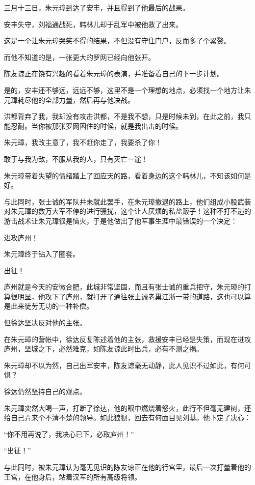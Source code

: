 \begin{multicols}{\theparacolNo}
		三月十三日，朱元璋到达了安丰，并且得到了他最后的战果。

		安丰失守，刘福通战死，韩林儿却于乱军中被他救了出来。

		这是一个让朱元璋哭笑不得的结果，不但没有守住门户，反而多了个累赘。

		而他不知道的是，一张更大的罗网已经向他张开。

		陈友谅正在饶有兴趣的看着朱元璋的表演，并准备着自己的下一步计划。

		是的，安丰还不够远，远远不够，这里不是一个理想的地点，必须找一个地方让朱元璋耗尽他的全部力量，然后再与他决战。

		洪都背弃了我，我却没有攻击洪都，不是我不想，只是时候未到，在此之前，我只能忍耐。当你被那张罗网困住的时候，就是我出击的时候。

		朱元璋，我改主意了，我不赶你走了，我要杀了你！

		敢于与我为敌，不服从我的人，只有灭亡一途！

		朱元璋带着失望的情绪踏上了回应天的路，看着身边的这个韩林儿，不知该如何是好。

		与此同时，张士诚的军队并未就此罢手，在朱元璋撤退的路上，他们组成小股武装对朱元璋的数万大军不停的进行骚扰，这个让人厌烦的私盐贩子！这种不打不逃的游击战术让朱元璋很是恼火，于是他做出了他军事生涯中最错误的一个决定：

		进攻庐州！

		朱元璋终于钻入了圈套。

		出征！

		庐州就是今天的安徽合肥，此城非常坚固，而且有张士诚的重兵把守，朱元璋的打算很明显，他攻下了庐州，就打开了通往张士诚老巢江浙一带的道路，这也可以算是此来徒劳无功的一种补偿。

		但徐达坚决反对他的主张。

		在朱元璋的营帐中，徐达反复陈述着他的主张，救援安丰已经是失策，而现在进攻庐州，坚城之下，必然难克，如陈友谅此时出兵，必有不测之祸。

		朱元璋却不以为然，自己出军安丰，陈友谅毫无动静，此人见识不过如此，有何可惧？

		徐达仍然坚持自己的观点。

		朱元璋突然大喝一声，打断了徐达，他的眼中燃烧着怒火，此行不但毫无建树，还给自己弄来个不清不楚的领导。如此狼狈，回去有何面目见刘基。他下定了决心：

		“你不用再说了，我决心已下，必取庐州！”

		“出征！”

		与此同时，被朱元璋认为毫无见识的陈友谅正在他的行宫里，最后一次打量着他的王宫，在他身后，站着汉军的所有高级将领。


\end{multicols}
